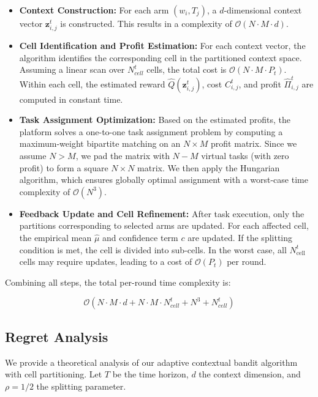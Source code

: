 \begin{itemize}
    \item \textbf{Context Construction:} For each arm $(w_i, T_j)$, a $d$-dimensional context vector $\mathbf{z}_{i,j}^t$ is constructed. This results in a complexity of $\mathcal{O}(N \cdot M \cdot d)$.

    \item \textbf{Cell Identification and Profit Estimation:} For each context vector, the algorithm identifies the corresponding cell in the partitioned context space. Assuming a linear scan over $N_{cell}^t$ cells, the total cost is $\mathcal{O}(N \cdot M \cdot P_t)$. Within each cell, the estimated reward $\hat{Q}(\mathbf{z}_{i,j}^t)$, cost $C_{i,j}^t$, and profit $\hat{\Pi}_{i,j}^t$ are computed in constant time.

    \item \textbf{Task Assignment Optimization:} Based on the estimated profits, the platform solves a one-to-one task assignment problem by computing a maximum-weight bipartite matching on an $N \times M$ profit matrix. Since we assume $N > M$, we pad the matrix with $N - M$ virtual tasks (with zero profit) to form a square $N \times N$ matrix. We then apply the Hungarian algorithm, which ensures globally optimal assignment with a worst-case time complexity of $\mathcal{O}(N^3)$.

    \item \textbf{Feedback Update and Cell Refinement:} After task execution, only the partitions corresponding to selected arms are updated. For each affected cell, the empirical mean $\hat{\mu}$ and confidence term $c$ are updated. If the splitting condition is met, the cell is divided into sub-cells. In the worst case, all $N_{\text{cell}}^t$ cells may require updates, leading to a cost of $\mathcal{O}(P_t)$ per round.

\end{itemize}

\noindent
Combining all steps, the total per-round time complexity is:

\[
\mathcal{O}(N \cdot M \cdot d + N \cdot M \cdot N_{cell}^t + N^3 + N_{cell}^t)
\]

\subsection{Regret Analysis}

We provide a theoretical analysis of our adaptive contextual bandit algorithm with cell partitioning. Let $T$ be the time horizon, $d$ the context dimension, and $\rho=1/2$ the splitting parameter.

